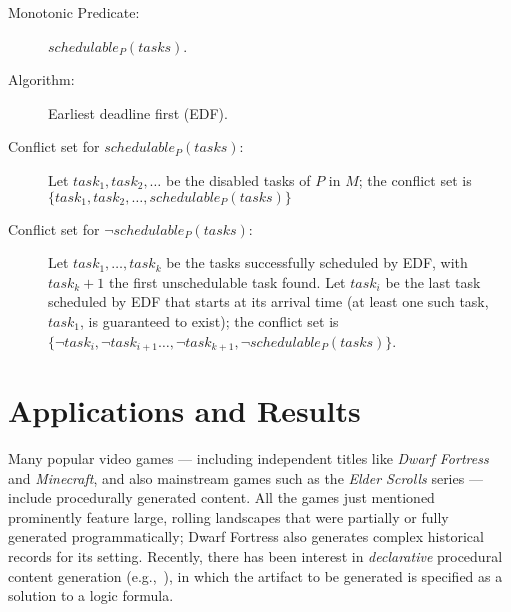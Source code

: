 \documentclass[runningheads]{llncs}
\begin{document}
\begin{description}
\item[Monotonic Predicate:] $schedulable_P(tasks)$.
\item[Algorithm:] Earliest deadline first (EDF).
\item[Conflict set for $schedulable_P(tasks)$:] Let $task_1, task_2,\ldots$ be the disabled tasks of $P$ in $M$; the conflict set is $\{task_1, task_2, \ldots, schedulable_P(tasks)\}$
\item[Conflict set for $\lnot schedulable_P(tasks)$:] Let $task_1, \ldots, task_k$ be the tasks successfully scheduled by EDF, with $task_k+1$ the first unschedulable task found. 
Let $task_i$ be the last task scheduled by EDF that starts at its arrival time (at least one such task, $task_1$, is guaranteed to exist); the conflict set is $\{\lnot task_i, \lnot task_{i+1} \ldots, \lnot task_{k+1}, \lnot schedulable_P(tasks) \}$.


\end{description}




\section{Applications and Results \label{sec:graph}}

Many popular video games --- including independent titles like \textit{Dwarf Fortress} and \textit{Minecraft}, and also mainstream games such as the\textit{ Elder Scrolls} series --- include procedurally generated content. All the games just mentioned prominently feature large, rolling landscapes that were partially or fully generated programmatically; Dwarf Fortress also generates complex historical records for its setting. Recently, there has been interest in \textit{declarative} procedural content generation (e.g.,~\cite{boenn2008automatic,smith2011answer}), in which the artifact to be generated is specified as a solution to a logic formula.
\end{document}
